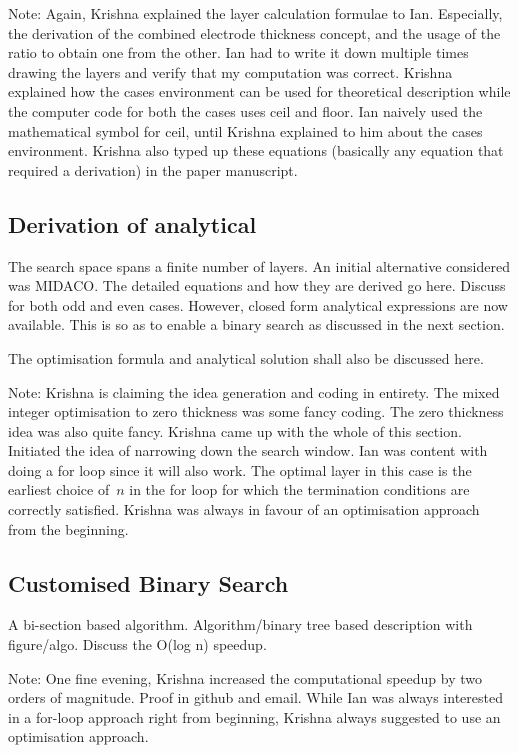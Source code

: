 Note:  Again,  Krishna   explained  the  layer  calculation   formulae  to  Ian.
Especially, the derivation of the  combined electrode thickness concept, and the
usage of  the ratio  to obtain  one from  the other.  Ian had  to write  it down
multiple times  drawing the layers and  verify that my computation  was correct.
Krishna  explained  how  the  cases  environment can  be  used  for  theoretical
description while the computer code for both  the cases uses ceil and floor. Ian
naively used  the mathematical symbol for  ceil, until Krishna explained  to him
about the  cases environment. Krishna  also typed up these  equations (basically
any equation that required a derivation) in the paper manuscript.

\subsection{Derivation of analytical }

The  search space  spans  a  finite number  of  layers.  An initial  alternative
considered was MIDACO. The detailed equations  and how they are derived go here.
Discuss for both odd and even cases. However, closed form analytical expressions
are now available. This  is so as to enable a binary search  as discussed in the
next section.

The optimisation formula and analytical solution shall also be discussed here.

Note: Krishna is claiming the idea  generation and coding in entirety. The mixed
integer optimisation to zero thickness was some fancy coding. The zero thickness
idea was  also quite  fancy. Krishna  came up  with the  whole of  this section.
Initiated the  idea of narrowing  down the search  window. Ian was  content with
doing a for loop since it will also  work. The optimal layer in this case is the
earliest choice of~$n$ in the for  loop for which the termination conditions are
correctly satisfied.  Krishna was always  in favour of an  optimisation approach
from the beginning.

\subsection{Customised Binary Search}

A  bi-section  based algorithm.  Algorithm/binary  tree  based description  with
figure/algo. Discuss the O(log n) speedup.

Note: One fine evening, Krishna increased the computational speedup by two orders of magnitude. Proof in github and email. While Ian was always interested in a for-loop approach right from beginning, Krishna always suggested to use an optimisation approach.

